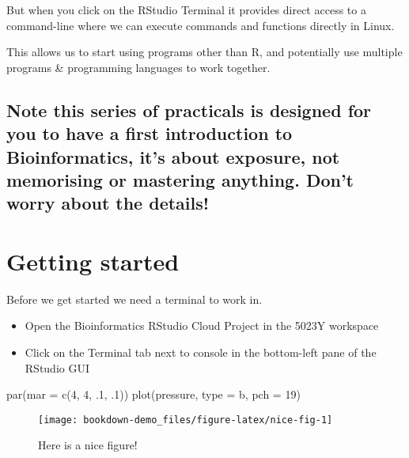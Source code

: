 \documentclass[
]{book}
\newenvironment{Shaded}{\begin{snugshade}}{\end{snugshade}}
\newcommand{\AttributeTok}[1]{\textcolor[rgb]{0.77,0.63,0.00}{#1}}
\newcommand{\DecValTok}[1]{\textcolor[rgb]{0.00,0.00,0.81}{#1}}
\newcommand{\FunctionTok}[1]{\textcolor[rgb]{0.00,0.00,0.00}{#1}}
\newcommand{\NormalTok}[1]{#1}
\newcommand{\StringTok}[1]{\textcolor[rgb]{0.31,0.60,0.02}{#1}}
\begin{document}
But when you click on the RStudio Terminal it provides direct access to a command-line where we can execute commands and functions directly in Linux.

This allows us to start using programs other than R, and potentially use multiple programs \& programming languages to work together.

\hypertarget{note-this-series-of-practicals-is-designed-for-you-to-have-a-first-introduction-to-bioinformatics-its-about-exposure-not-memorising-or-mastering-anything.-dont-worry-about-the-details}{%
\subsection{Note this series of practicals is designed for you to have a first introduction to Bioinformatics, it's about exposure, not memorising or mastering anything. Don't worry about the details!}\label{note-this-series-of-practicals-is-designed-for-you-to-have-a-first-introduction-to-bioinformatics-its-about-exposure-not-memorising-or-mastering-anything.-dont-worry-about-the-details}}

\hypertarget{getting-started}{%
\section{Getting started}\label{getting-started}}

Before we get started we need a terminal to work in.

\begin{itemize}
\item
  Open the Bioinformatics RStudio Cloud Project in the 5023Y workspace
\item
  Click on the Terminal tab next to console in the bottom-left pane of the RStudio GUI
\end{itemize}

\begin{Shaded}
\begin{Highlighting}[]
\FunctionTok{par}\NormalTok{(}\AttributeTok{mar =} \FunctionTok{c}\NormalTok{(}\DecValTok{4}\NormalTok{, }\DecValTok{4}\NormalTok{, .}\DecValTok{1}\NormalTok{, .}\DecValTok{1}\NormalTok{))}
\FunctionTok{plot}\NormalTok{(pressure, }\AttributeTok{type =} \StringTok{\textquotesingle{}b\textquotesingle{}}\NormalTok{, }\AttributeTok{pch =} \DecValTok{19}\NormalTok{)}
\end{Highlighting}
\end{Shaded}

\begin{figure}

{\centering \texttt{[image: bookdown-demo\_files/figure-latex/nice-fig-1]} 

}

\caption{Here is a nice figure!}\label{fig:nice-fig}
\end{figure}
\end{document}
